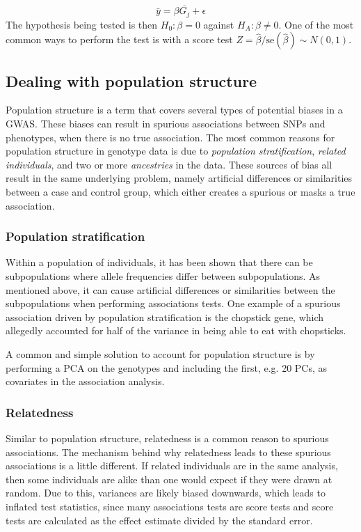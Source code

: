 \begin{equation}\label{eq:univarGWAS}
\bar{y} = \beta \bar{G_j} + \epsilon
\end{equation}
The hypothesis being tested is then $ H_0: \beta = 0 $ against $ H_A: \beta \neq 0 $. One of the most common ways to perform the test is with a score test $ Z = \hat{\beta}/\text{se}(\hat{\beta}) \sim N(0,1)$. 

\subsection{Dealing with population structure}
Population structure is a term that covers several types of potential biases in a GWAS. These biases can result in spurious associations between SNPs and phenotypes, when there is no true association. The most common reasons for population structure in genotype data is due to \textit{population stratification}, \textit{related individuals}, and two or more \textit{ancestries} in the data. These sources of bias all result in the same underlying problem, namely artificial differences or similarities between a case and control group, which either creates a spurious or masks a true association. 

\subsubsection{Population stratification}
Within a population of individuals, it has been shown that there can be subpopulations where allele frequencies differ between subpopulations. As mentioned above, it can cause artificial differences or similarities between the subpopulations when performing associations tests. One example of a spurious association driven by population stratification is the chopstick gene, which allegedly accounted for half of the variance in being able to eat with chopsticks.\cite{marees2018tutorial} 

A common and simple solution to account for population structure is by performing a PCA on the genotypes and including the first, e.g. 20 PCs, as covariates in the association analysis. 

\subsubsection{Relatedness}
Similar to population structure, relatedness is a common reason to spurious associations. The mechanism behind why relatedness leads to these spurious associations is a little different. If related individuals are in the same analysis, then some individuals are alike than one would expect if they were drawn at random. Due to this, variances are likely biased downwards, which leads to inflated test statistics, since many associations tests are score tests and score tests are calculated as the effect estimate divided by the standard error. 


